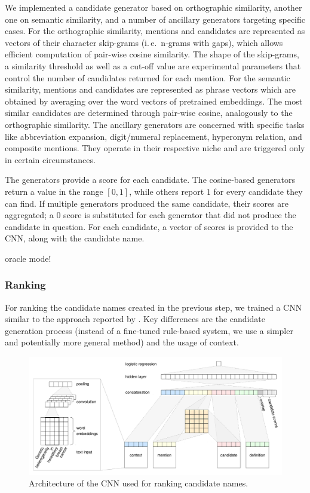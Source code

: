 \documentclass{bioinfo}
\newcommand{\ie}{i.\,e.\ }
\begin{document}
We implemented a candidate generator based on orthographic similarity, another one on semantic similarity, and a number of ancillary generators targeting specific cases.
For the orthographic similarity, mentions and candidates are represented as vectors of their character skip-grams (\ie n-grams with gaps),  %
which allows efficient computation of pair-wise cosine similarity.
The shape of the skip-grams, a similarity threshold as well as a cut-off value are experimental parameters that control the number of candidates returned for each mention.
For the semantic similarity, mentions and candidates are represented as phrase vectors which are obtained by averaging over the word vectors of pretrained embeddings.
The most similar candidates are determined through pair-wise cosine, analogously to the orthographic similarity.
The ancillary generators are concerned with specific tasks like abbreviation expansion, digit/numeral replacement, hyperonym relation, and composite mentions.
They operate in their respective niche and are triggered only in certain circumstances.

The generators provide a score for each candidate.
The cosine-based generators return a value in the range $[0,1]$, while others report $1$ for every candidate they can find.
If multiple generators produced the same candidate, their scores are aggregated; a $0$ score is substituted for each generator that did not produce the candidate in question.
For each candidate, a vector of scores is provided to the CNN, along with the candidate name.

oracle mode!

\subsubsection{Ranking}
\label{ssub:ranking}

For ranking the candidate names created in the previous step, we trained a CNN similar to the approach reported by \cite{lihaodi-et-al:2017}.
Key differences are the candidate generation process (instead of a fine-tuned rule-based system, we use a simpler and potentially more general method) and the usage of context.

\begin{figure}[!tpb]
\centerline{\includegraphics[width=\textwidth]{img/nn-arch.pdf}}
\caption{Architecture of the CNN used for ranking candidate names.}\label{fig:sys-arch}
\end{figure}
\end{document}
